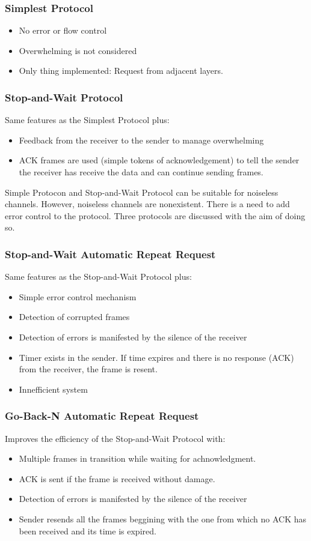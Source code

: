 \subsubsection{Simplest Protocol}
\begin{itemize}
\item No error or flow control
\item Overwhelming is not considered
\item Only thing implemented: Request from adjacent layers.
\end{itemize}
\subsubsection{Stop-and-Wait Protocol}
Same features as the Simplest Protocol plus:
\begin{itemize}
\item Feedback from the receiver to the sender to manage overwhelming
\item ACK frames are used (simple tokens of acknowledgement) to tell the sender the receiver has receive the data and can continue sending frames.\\
\end{itemize}

Simple Protocon and Stop-and-Wait Protocol can be suitable for noiseless channels. However, noiseless channels are nonexistent. There is a need to add error control to the protocol. Three protocols are discussed with the aim of doing so.
\subsubsection{Stop-and-Wait Automatic Repeat Request}
Same features as the Stop-and-Wait Protocol plus:
\begin{itemize}
\item Simple error control mechanism
\item Detection of corrupted frames
\item Detection of errors is manifested by the silence of the receiver
\item Timer exists in the sender. If time expires and there is no response (ACK) from the receiver, the frame is resent.
\item Innefficient system
\end{itemize}  
\subsubsection{Go-Back-N Automatic Repeat Request}
Improves the efficiency of the Stop-and-Wait Protocol with:
\begin{itemize}
\item Multiple frames in transition while waiting for achnowledgment.
\item ACK is sent if the frame is received without damage.
\item Detection of errors is manifested by the silence of the receiver
\item Sender resends all the frames beggining with the one from which no ACK has been received and its time is expired.
\end{itemize}
